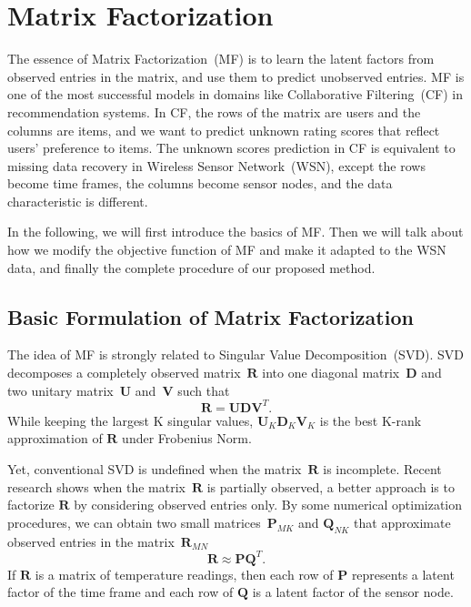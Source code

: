 \section{Matrix Factorization}  \label{sec:mf}


The essence of Matrix Factorization~(MF) is to learn the latent factors from observed entries in the matrix, and use them to predict unobserved entries.  MF is one of the most successful models in domains like Collaborative Filtering~(CF) in recommendation systems. In CF, the rows of the matrix are users and the columns are items, and we want to predict unknown rating scores that reflect users' preference to items. The unknown scores prediction in CF is equivalent to missing data recovery in Wireless Sensor Network~(WSN), except the rows become time frames, the columns become sensor nodes, and the data characteristic is different. 

In the following, we will first introduce the basics of MF. Then we will talk about how we modify the objective function of MF and make it adapted to the WSN data, and finally the complete procedure of our proposed method.

\subsection{Basic Formulation of Matrix Factorization}

The idea of MF is strongly related to Singular Value Decomposition~(SVD). SVD decomposes a completely observed matrix~$\mathbf{R}$ into one diagonal matrix~$\mathbf{D}$ and two unitary matrix~$\mathbf{U}$ and~$\mathbf{V}$ such that
\begin{equation*} \mathbf{R} = \mathbf{U}\mathbf{D}\mathbf{V}^T. \end{equation*}
While keeping the largest K singular values, $\mathbf{U}_K \mathbf{D}_K \mathbf{V}_K$ is the best K-rank approximation of $\mathbf{R}$ under Frobenius Norm. 

Yet, conventional SVD is undefined when the matrix~$\mathbf{R}$ is incomplete. Recent research shows\cite{koren2009matrix} when the matrix~$\mathbf{R}$ is partially observed, a better approach is to factorize $\mathbf{R}$ by considering observed entries only. By some numerical optimization procedures, we can obtain two small matrices~$\mathbf{P}_{MK}$ and $\mathbf{Q}_{NK}$ that approximate observed entries in the matrix~$\mathbf{R}_{MN}$
\begin{equation*}\mathbf{R} \approx \mathbf{P} \mathbf{Q}^T.\end{equation*}
If $\mathbf{R}$ is a matrix of temperature readings, then each row of $\mathbf{P}$ represents a latent factor of the time frame and each row of $\mathbf{Q}$ is a latent factor of the sensor node.

